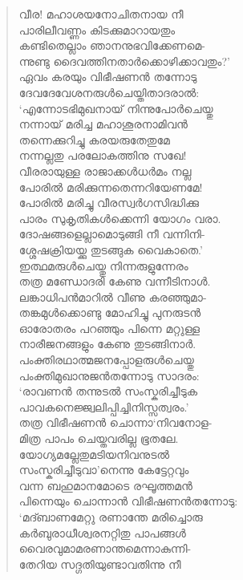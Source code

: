 \begin{verse}
വീര! മഹാശയനോചിതനായ നീ\\
പാരിലീവണ്ണം കിടക്കുമാറായതും\\
കണ്ടിതെല്ലാം ഞാനനുഭവിക്കേണമെ-\\
ന്നുണ്ടു ദൈവത്തിനതാര്‍ക്കൊഴിക്കാവതും?’\\
ഏവം കരയും വിഭീഷണന്‍ തന്നോടു\\
ദേവദേവേശനരുള്‍ചെയ്തിതാദരാല്‍:\\
‘എന്നോടഭിമുഖനായ് നിന്നുപോര്‍ചെയ്തു\\
നന്നായ് മരിച്ച മഹാശൂരനാമിവന്‍\\
തന്നെക്കുറിച്ചു കരയരുതേതുമേ\\
നന്നല്ലതു പരലോകത്തിനു സഖേ!\\
വീരരായുള്ള രാജാക്കള്‍ധര്‍മം നല്ല\\
പോരില്‍ മരിക്കുന്നതെന്നറിയേണമേ!\\
പോരില്‍ മരിച്ചു വീരസ്വര്‍ഗസിദ്ധിക്കു\\
പാരം സുകൃതികള്‍ക്കെന്നി യോഗം വരാ.\\
ദോഷങ്ങളെല്ലാമൊടുങ്ങി നീ വന്നിനി-\\
ശ്ശേഷക്രിയയ്ക്കു തുടങ്ങുക വൈകാതെ.’\\
ഇത്ഥമരുള്‍ചെയ്തു നിന്നരുളുന്നേരം\\
തത്ര മണ്ഡോദരി കേണു വന്നീടിനാള്‍.\\
ലങ്കാധിപന്‍മാറില്‍ വീണു കരഞ്ഞുമാ-\\
തങ്കമുള്‍ക്കൊണ്ടു മോഹിച്ചു പുനരുടന്‍\\
ഓരോതരം പറഞ്ഞും പിന്നെ മറ്റുള്ള\\
നാരീജനങ്ങളും കേണു തുടങ്ങിനാര്‍.\\
പംക്തിരഥാത്മജനപ്പോളരുള്‍ചെയ്തു\\
പംക്തിമുഖാനുജന്‍തന്നോടു സാദരം:\\
‘രാവണന്‍ തന്നുടല്‍ സംസ്കരിച്ചീടുക\\
പാവകനെജ്ജ്വലിപ്പിച്ചിനിസ്സത്വരം.’\\
തത്ര വിഭീഷണന്‍ ചൊന്നാ‘നിവനോള-\\
മിത്ര പാപം ചെയ്തവരില്ല ഭൂതലേ.\\
യോഗ്യമല്ലേതുമടിയനിവനുടല്‍\\
സംസ്കരിച്ചീടുവാ’നെന്നു കേട്ടേറ്റവും\\
വന്ന ബഹുമാനമോടെ രഘൂത്തമന്‍\\
പിന്നെയും ചൊന്നാന്‍ വിഭീഷണന്‍തന്നോടു:\\
‘മദ്ബാണമേറ്റു രണാന്തേ മരിച്ചൊരു\\
കര്‍ബുരാധീശ്വരനറ്റിതു പാപങ്ങള്‍\\
വൈരവുമാമരണാന്തമെന്നാകുന്നി-\\
തേറിയ സദ്ഗതിയുണ്ടാവതിന്നു നീ\\

\end{verse}
